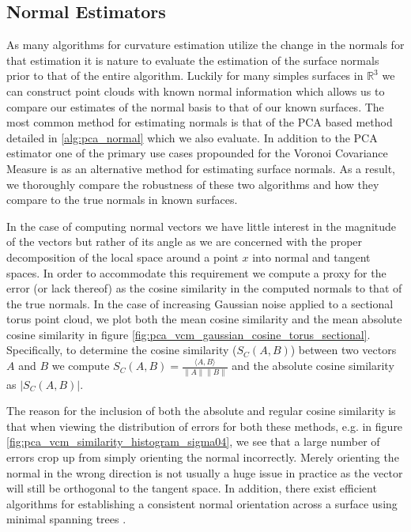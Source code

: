 \documentclass{article}
\begin{document}
\subsection{Normal Estimators}
As many algorithms for curvature estimation utilize the change in the normals for that estimation it is nature to evaluate the estimation of the surface normals prior to that of the entire algorithm. Luckily for many simples surfaces in $\mathbb{R}^3$ we can construct point clouds with known normal information which allows us to compare our estimates of the normal basis to that of our known surfaces. The most common method for estimating normals is that of the PCA based method detailed in \eqref{alg:pca_normal} which we also evaluate. In addition to the PCA estimator one of the primary use cases propounded for the Voronoi Covariance Measure is as an alternative method for estimating surface normals. As a result, we thoroughly compare the robustness of these two algorithms and how they compare to the true normals in known surfaces.

In the case of computing normal vectors we have little interest in the magnitude of the vectors but rather of its angle as we are concerned with the proper decomposition of the local space around a point $x$ into normal and tangent spaces. In order to accommodate this requirement we compute a proxy for the error (or lack thereof) as the cosine similarity in the computed normals to that of the true normals. In the case of increasing Gaussian noise applied to a sectional torus point cloud, we plot both the mean cosine similarity and the mean absolute cosine similarity in figure \ref{fig:pca_vcm_gaussian_cosine_torus_sectional}. Specifically, to determine the cosine similarity ($S_C(A,B)$) between two vectors $A$ and $B$ we compute $S_C(A,B) = \frac{\langle A, B \rangle}{\|A\|\|B\|}$ and the absolute cosine similarity as $|S_C(A,B)|$.


The reason for the inclusion of both the absolute and regular cosine similarity is that when viewing the distribution of errors for both these methods, e.g. in figure \ref{fig:pca_vcm_similarity_histogram_sigma04}, we see that a large number of errors crop up from simply orienting the normal incorrectly. Merely orienting the normal in the wrong direction is not usually a huge issue in practice as the vector will still be orthogonal to the tangent space. In addition, there exist efficient algorithms for establishing a consistent normal orientation across a surface using minimal spanning trees \cite{hoppe1992surface}.       
\end{document}
